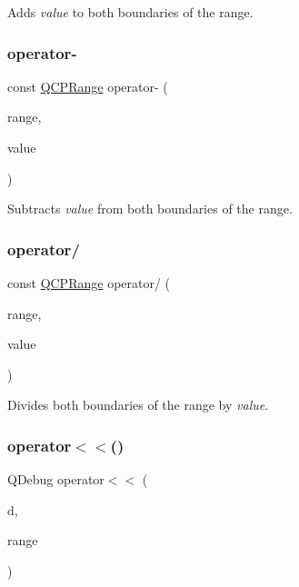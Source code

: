 Adds {\itshape value} to both boundaries of the range. \mbox{\label{class_q_c_p_range_a797f82830b516646da8873f82e39e356}} 
\subsubsection{\texorpdfstring{operator-\/}{operator-}}
{\footnotesize\ttfamily const \hyperlink{class_q_c_p_range}{Q\+C\+P\+Range} operator-\/ (\begin{DoxyParamCaption}\item[{const \hyperlink{class_q_c_p_range}{Q\+C\+P\+Range} \&}]{range,  }\item[{double}]{value }\end{DoxyParamCaption})\hspace{0.3cm}{\ttfamily [friend]}}

Subtracts {\itshape value} from both boundaries of the range. \mbox{\label{class_q_c_p_range_a4b366a3a21974c88e09b0d39d4a24a4b}} 
\subsubsection{\texorpdfstring{operator/}{operator/}}
{\footnotesize\ttfamily const \hyperlink{class_q_c_p_range}{Q\+C\+P\+Range} operator/ (\begin{DoxyParamCaption}\item[{const \hyperlink{class_q_c_p_range}{Q\+C\+P\+Range} \&}]{range,  }\item[{double}]{value }\end{DoxyParamCaption})\hspace{0.3cm}{\ttfamily [friend]}}

Divides both boundaries of the range by {\itshape value}. \mbox{\label{class_q_c_p_range_ab4b7d434541ec2e2e00ef3764dde90d8}} 
\subsubsection{\texorpdfstring{operator$<$$<$()}{operator<<()}}
{\footnotesize\ttfamily Q\+Debug operator$<$$<$ (\begin{DoxyParamCaption}\item[{Q\+Debug}]{d,  }\item[{const \hyperlink{class_q_c_p_range}{Q\+C\+P\+Range} \&}]{range }\end{DoxyParamCaption})\hspace{0.3cm}{\ttfamily [related]}}

